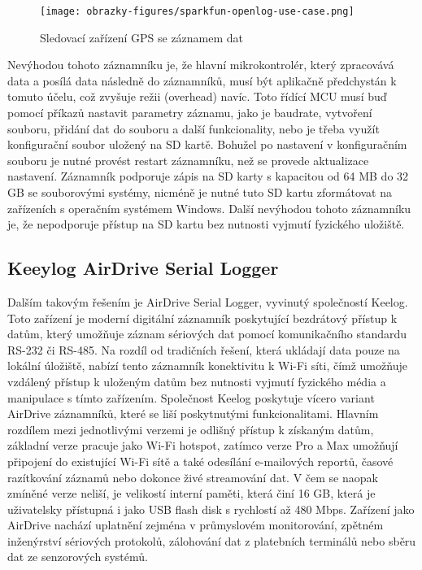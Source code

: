 \begin{figure}[h]
    \centering
    \texttt{[image: obrazky-figures/sparkfun-openlog-use-case.png]}
    
    \caption{Sledovací zařízení GPS se záznamem dat \cite{cirkit_openlog}}
    \label{fig:sparkfun-openlog-use-case}
\end{figure}

Nevýhodou tohoto záznamníku je, že hlavní mikrokontrolér, který zpracovává data a posílá data následně do záznamníků, musí být aplikačně předchystán k tomuto účelu, což zvyšuje režii (overhead) navíc. Toto řídící MCU musí buď pomocí příkazů nastavit parametry záznamu, jako je baudrate, vytvoření souboru, přidání dat do souboru a další funkcionality, nebo je třeba využít konfigurační soubor uložený na SD kartě. Bohužel po nastavení v konfiguračním souboru je nutné provést restart záznamníku, než se provede aktualizace nastavení. Záznamník podporuje zápis na SD karty s kapacitou od 64 MB do 32 GB se souborovými systémy, nicméně je nutné tuto SD kartu zformátovat na zařízeních s operačním systémem Windows. Další nevýhodou tohoto záznamníku je, že nepodporuje přístup na SD kartu bez nutnosti vyjmutí fyzického uložiště.

\subsection{Keeylog AirDrive Serial Logger}
\label{keelog_airdrive_serial_datalogger}
Dalším takovým řešením je AirDrive Serial Logger, vyvinutý společností Keelog. Toto zařízení je moderní digitální záznamník poskytující bezdrátový přístup k datům, který umožňuje záznam sériových dat pomocí komunikačního standardu RS-232 či RS-485. Na rozdíl od tradičních řešení, která ukládají data pouze na lokální úložiště, nabízí tento záznamník konektivitu k Wi-Fi síti, čímž umožňuje vzdálený přístup k uloženým datům bez nutnosti vyjmutí fyzického média a manipulace s tímto zařízením. Společnost Keelog poskytuje vícero variant AirDrive záznamníků, které se liší poskytnutými funkcionalitami. Hlavním rozdílem mezi jednotlivými verzemi je odlišný přístup k získaným datům, základní verze pracuje jako Wi-Fi hotspot, zatímco verze Pro a Max umožňují připojení do existující Wi-Fi sítě a také odesílání e-mailových reportů, časové razítkování záznamů nebo dokonce živé streamování dat. V čem se naopak zmíněné verze neliší, je velikostí interní paměti, která činí 16 GB, která je uživatelsky přístupná i jako USB flash disk s rychlostí až 480 Mbps. Zařízení jako AirDrive nachází uplatnění zejména v průmyslovém monitorování, zpětném inženýrství sériových protokolů, zálohování dat z platebních terminálů nebo sběru dat ze senzorových systémů. \cite{keelog_airdrive_serial_datalogger, keelog_airdrive_serial_datalogger_max, keelog_airdrive_serial_datalogger_pro}

